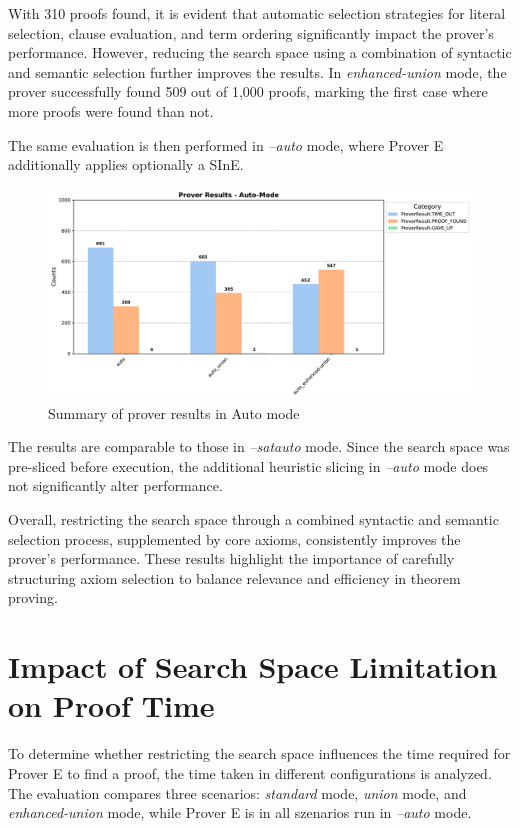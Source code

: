 \documentclass[english,version-2020-11]{uzl-thesis}
\begin{document}
With 310 proofs found, it is evident that automatic selection strategies for literal selection, clause evaluation, and term ordering significantly impact the prover's performance. However, reducing the search space using a combination of syntactic and semantic selection further improves the results. In \textit{enhanced-union} mode, the prover successfully found 509 out of 1,000 proofs, marking the first case where more proofs were found than not.

The same evaluation is then performed in \textit{--auto} mode, where Prover E additionally applies optionally a SInE.

\begin{figure}[h!]
    \centering
    \includegraphics[width=\textwidth]{auto_mode_output.pdf}
    \caption{Summary of prover results in Auto mode}
    \label{fig:prover_results_auto}
\end{figure}
\FloatBarrier

The results are comparable to those in \textit{--satauto} mode. Since the search space was pre-sliced before execution, the additional heuristic slicing in \textit{--auto} mode does not significantly alter performance.

Overall, restricting the search space through a combined syntactic and semantic selection process, supplemented by core axioms, consistently improves the prover’s performance. These results highlight the importance of carefully structuring axiom selection to balance relevance and efficiency in theorem proving.

\section{Impact of Search Space Limitation on Proof Time}

To determine whether restricting the search space influences the time required for Prover E to find a proof, the time taken in different configurations is analyzed. The evaluation compares three scenarios: \textit{standard} mode, \textit{union} mode, and \textit{enhanced-union} mode, while Prover E is in all szenarios run in \textit{--auto} mode.
\end{document}
